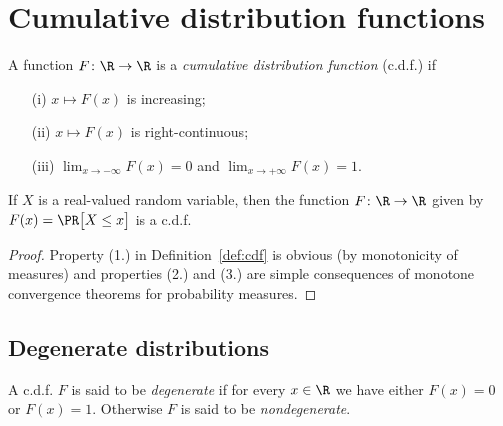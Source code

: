 \chapter{Cumulative distribution functions}

\begin{definition}
  \label{def:cdf}
  \leanok
  A function $F \colon \R \to \R$ is a
  \emph{cumulative distribution function} (c.d.f.) if
  \begin{enumerate}
  \item[(i)] $x \mapsto F(x)$ is increasing;
  \item[(ii)] $x \mapsto F(x)$ is right-continuous;
  \item[(iii)] $\lim_{x \to -\infty} F(x) = 0$ and $\lim_{x \to +\infty} F(x) = 1$.
  \end{enumerate}
\end{definition}

\begin{lemma}
  \label{lem:cdf-of-random-var}
  \leanok
  If $X$ is a real-valued random variable, then the function
  $F \colon \R \to \R$ given by $F(x) = \PR \big[ X \le x \big]$ is a c.d.f.
\end{lemma}
\begin{proof}
  Property (1.) in Definition~\ref{def:cdf} is obvious (by monotonicity of measures)
  and properties (2.) and (3.) are simple consequences of monotone convergence
  theorems for probability measures.
\end{proof}

\section{Degenerate distributions}

\begin{definition}
  \label{def:degenerate-cdf}
  \leanok
  A c.d.f. $F$ is said to be
  \emph{degenerate} if for every $x \in \R$ we have either $F(x) = 0$ or $F(x) = 1$.
  Otherwise $F$ is said to be \emph{nondegenerate}.
\end{definition}

